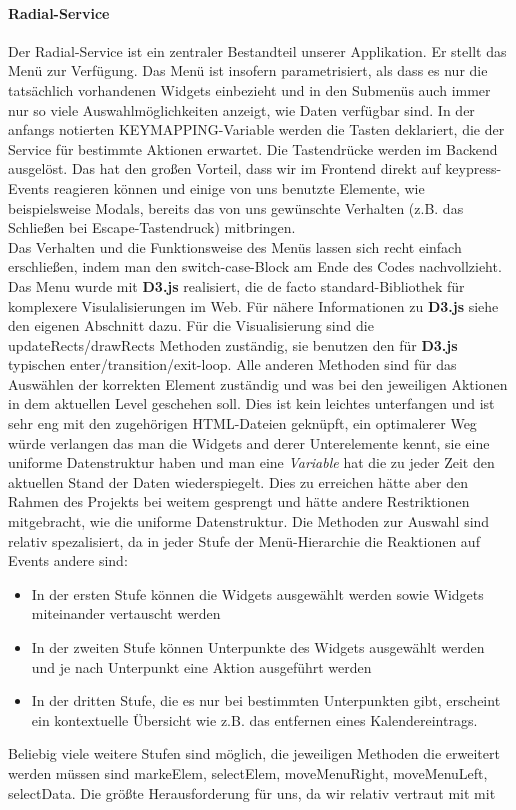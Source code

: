 \documentclass[10pt,a4paper]{report}
\newcommand{\code}[1]{{\fontfamily{cmvtt}\selectfont #1}}
\begin{document}
				\paragraph{Radial-Service}
					Der Radial-Service ist ein zentraler Bestandteil unserer Applikation. Er stellt das Menü zur Verfügung. Das Menü ist insofern parametrisiert, als dass es nur die tatsächlich vorhandenen Widgets einbezieht und in den Submenüs auch immer nur so viele Auswahlmöglichkeiten anzeigt, wie Daten verfügbar sind. In der anfangs notierten \code{KEYMAPPING}-Variable werden die Tasten deklariert, die der Service für bestimmte Aktionen erwartet. Die Tastendrücke werden im Backend ausgelöst. Das hat den großen Vorteil, dass wir im Frontend direkt auf keypress-Events reagieren können und einige von uns benutzte Elemente, wie beispielsweise Modals, bereits das von uns gewünschte Verhalten (z.B. das Schließen bei Escape-Tastendruck) mitbringen.\\
					Das Verhalten und die Funktionsweise des Menüs lassen sich recht einfach erschließen, indem man den switch-case-Block am Ende des Codes nachvollzieht.
					Das Menu wurde mit \textbf{D3.js} realisiert, die de facto standard-Bibliothek für komplexere Visulalisierungen im Web.
					Für nähere Informationen zu \textbf{D3.js} siehe den eigenen Abschnitt dazu.
					Für die Visualisierung sind die \code{updateRects/drawRects} Methoden zuständig, sie benutzen den für \textbf{D3.js} typischen enter/transition/exit-loop.
					Alle anderen Methoden sind für das Auswählen der korrekten Element zuständig und was bei den jeweiligen Aktionen in dem aktuellen Level geschehen soll.
					Dies ist kein leichtes unterfangen und ist sehr eng mit den zugehörigen HTML-Dateien geknüpft, ein optimalerer Weg würde verlangen das man die Widgets and derer Unterelemente kennt, sie eine uniforme Datenstruktur haben und man eine \textit{Variable} hat die zu jeder Zeit den aktuellen Stand der Daten wiederspiegelt.
					Dies zu erreichen hätte aber den Rahmen des Projekts bei weitem gesprengt und hätte andere Restriktionen mitgebracht, wie die uniforme Datenstruktur.
					Die Methoden zur Auswahl sind relativ spezalisiert, da in jeder Stufe der Menü-Hierarchie die Reaktionen auf Events andere sind:
					\begin{itemize}
						\item In der ersten Stufe können die Widgets ausgewählt werden sowie Widgets miteinander vertauscht werden
						\item In der zweiten Stufe können Unterpunkte des Widgets ausgewählt werden und je nach Unterpunkt eine Aktion ausgeführt werden
						\item In der dritten Stufe, die es nur bei bestimmten Unterpunkten gibt, erscheint ein kontextuelle Übersicht wie z.B. das entfernen eines Kalendereintrags.
					\end{itemize}
					Beliebig viele weitere Stufen sind möglich, die jeweiligen Methoden die erweitert werden müssen sind \code{markeElem, selectElem, moveMenuRight, moveMenuLeft, selectData}.
					Die größte Herausforderung für uns, da wir relativ vertraut mit mit
\end{document}
